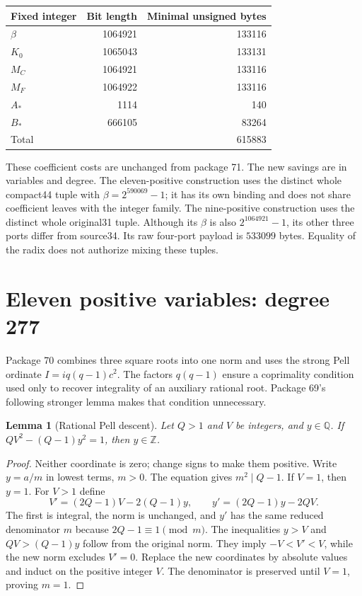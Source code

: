 \documentclass[11pt]{article}
\newtheorem{lemma}[theorem]{Lemma}
\newcommand{\Z}{\mathbb Z}
\begin{document}
\begin{center}
\begin{tabular}{@{}lrr@{}}
\toprule Fixed integer & Bit length & Minimal unsigned bytes\\\midrule
$\beta$ &1064921&133116\\
$K_0$ &1065043&133131\\
$M_C$ &1064921&133116\\
$M_F$ &1064922&133116\\
$A_*$ &1114&140\\
$B_*$ &666105&83264\\\midrule
Total &&615883\\\bottomrule
\end{tabular}
\end{center}
These coefficient costs are unchanged from package 71. The new savings are
in variables and degree. The eleven-positive construction uses the distinct
whole compact44 tuple with $\beta=2^{590069}-1$; it has its own binding and
does not share coefficient leaves with the integer family.
The nine-positive construction uses the distinct whole original31 tuple.
Although its $\beta$ is also $2^{1064921}-1$, its other three ports differ
from source34. Its raw four-port payload is $533099$ bytes.
Equality of the radix does not authorize mixing these tuples.

\section{Eleven positive variables: degree 277}
\label{sec:positive}
Package 70 combines three square roots into one norm and uses the strong
Pell ordinate $I=i q(q-1)c^2$. The factors $q(q-1)$ ensure a coprimality
condition used only to recover integrality of an auxiliary rational root.
Package 69's following stronger lemma makes that condition unnecessary.

\begin{lemma}[Rational Pell descent]\label{lem:descent}
Let $Q>1$ and $V$ be integers, and $y\in\mathbb Q$. If
$QV^2-(Q-1)y^2=1$, then $y\in\Z$.
\end{lemma}
\begin{proof}
Neither coordinate is zero; change signs to make them positive. Write
$y=a/m$ in lowest terms, $m>0$. The equation gives $m^2\mid Q-1$.
If $V=1$, then $y=1$. For $V>1$ define
\[
 V'=(2Q-1)V-2(Q-1)y,\qquad y'=(2Q-1)y-2QV.
\]
The first is integral, the norm is unchanged, and $y'$ has the same reduced
denominator $m$ because $2Q-1\equiv1\pmod m$.
The inequalities $y>V$ and $QV>(Q-1)y$ follow from the original norm.
They imply $-V<V'<V$, while the new norm excludes $V'=0$.
Replace the new coordinates by absolute values and induct on the positive
integer $V$. The denominator is preserved until $V=1$, proving $m=1$.
\end{proof}
\end{document}

